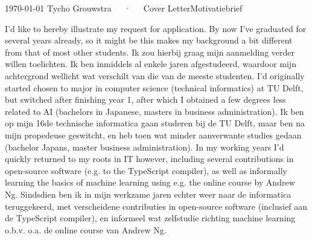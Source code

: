 \documentclass[11pt, a4paper]{awesome-cv}
\newcommand{\langen}[1]{\ifen#1\fi}
\newcommand{\langnl}[1]{\ifnl#1\fi}
\begin{document}
    \langen{}
    \langnl{}
    \makecvheader[R]
    \makecvfooter
      {\today}
      {Tycho Grouwstra~~~·~~~\langen{Cover Letter}\langnl{Motivatiebrief}}
      {}
    \makelettertitle
    
    \begin{cvletter}
    
    \langen{I'd like to hereby illustrate my request for application.
    By now I've graduated for several years already, so it might be this makes my background a bit different from that of most other students.
    }\langnl{Ik zou hierbij graag mijn aanmelding verder willen toelichten.
    Ik ben inmiddels al enkele jaren afgestudeerd, waardoor mijn achtergrond wellicht wat verschilt van die van de meeste studenten.
    }
    \newline\newline
    \langen{
    I'd originally started chosen to major in computer science (technical informatics) at TU Delft, but switched after finishing year 1,
    after which I obtained a few degrees less related to AI (bachelors in Japanese, masters in business administration).
    }\langnl{Ik ben op mijn 16de technische informatica gaan studeren bij de TU Delft, maar ben na mijn propedeuse geswitcht,
    en heb toen wat minder aanverwante studies gedaan (bachelor Japans, master business administration).
    }
    \newline\newline
    \langen{In my working years I'd quickly returned to my roots in IT however,
    including several contributions in open-source software (e.g. to the TypeScript compiler),
    as well as informally learning the basics of machine learning using e.g. the online course by Andrew Ng.
    }\langnl{Sindsdien ben ik in mijn werkzame jaren echter weer naar de informatica teruggekeerd,
    met verscheidene contributies in open-source software (inclusief aan de TypeScript compiler),
    en informeel wat zelfstudie richting machine learning o.b.v. o.a. de online course van Andrew Ng.
    }
    \newline\newline

\end{cvletter}
\end{document}
